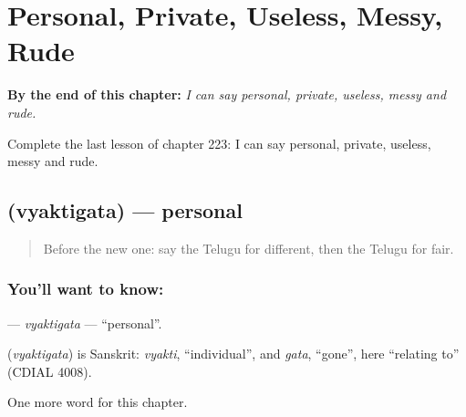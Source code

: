 
\chapter{Personal, Private, Useless, Messy, Rude}
\label{ch:te-personal-private-useless-messy-rude}

\begin{chapteropening}
\textbf{By the end of this chapter:} \emph{I can say personal, private, useless, messy and rude.}

Complete the last lesson of chapter 223: I can say personal, private, useless, messy and rude.
\end{chapteropening}

\section[\texorpdfstring{\te{వ్యక్తిగత} (vyaktigata)}{వ్యక్తిగత (vyaktigata)}]{ (vyaktigata) — personal}

\label{lesson:TE-C223-vyaktigata}



\begin{quote}
Before the new one: say the Telugu for different, then the Telugu for fair.
\end{quote}

\subsection*{You'll want to know: }
\textbf{} — \emph{vyaktigata} — \textquotedblleft{}personal\textquotedblright{}.

\begin{cousinweb}
\textbf{} (\emph{vyaktigata}) is Sanskrit: \emph{vyakti}, \textquotedblleft{}individual\textquotedblright{}, and \emph{gata}, \textquotedblleft{}gone\textquotedblright{}, here \textquotedblleft{}relating to\textquotedblright{} (CDIAL 4008).
\end{cousinweb}

\begin{grammarlens}[title={What you've built}]
One more word for this chapter.
\end{grammarlens}

